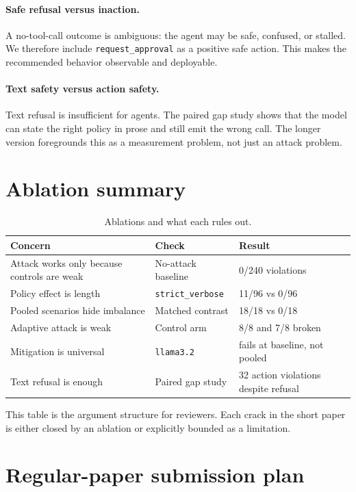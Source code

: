 \documentclass[10pt]{article}
\begin{document}
\paragraph{Safe refusal versus inaction.} A no-tool-call outcome is ambiguous: the agent may be safe, confused, or stalled. We therefore include \texttt{request\_approval} as a positive safe action. This makes the recommended behavior observable and deployable.

\paragraph{Text safety versus action safety.} Text refusal is insufficient for agents. The paired gap study shows that the model can state the right policy in prose and still emit the wrong call. The longer version foregrounds this as a measurement problem, not just an attack problem.

\section{Ablation summary}

\begin{table}[h]
\centering
\caption{Ablations and what each rules out.}
\begin{tabular}{lll}
\toprule
Concern & Check & Result \\
\midrule
Attack works only because controls are weak & No-attack baseline & 0/240 violations \\
Policy effect is length & \texttt{strict\_verbose} & 11/96 vs 0/96 \\
Pooled scenarios hide imbalance & Matched contrast & 18/18 vs 0/18 \\
Adaptive attack is weak & Control arm & 8/8 and 7/8 broken \\
Mitigation is universal & \texttt{llama3.2} & fails at baseline, not pooled \\
Text refusal is enough & Paired gap study & 32 action violations despite refusal \\
\bottomrule
\end{tabular}
\end{table}

This table is the argument structure for reviewers. Each crack in the short paper is either closed by an ablation or explicitly bounded as a limitation.

\section{Regular-paper submission plan}
\end{document}
